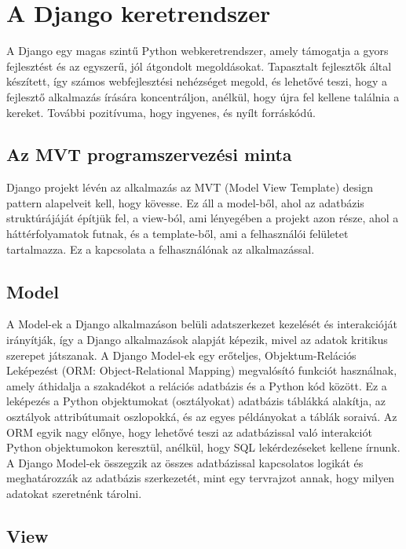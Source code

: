 \chapter{A Django keretrendszer}
\label{chap:intro}

A Django egy magas szintű Python webkeretrendszer, amely támogatja a gyors fejlesztést és az egyszerű, jól átgondolt megoldásokat. Tapasztalt fejlesztők által készített, így számos webfejlesztési nehézséget megold, és lehetővé teszi, hogy a fejlesztő alkalmazás írására koncentráljon, anélkül, hogy újra fel kellene találnia a kereket. További pozitívuma, hogy ingyenes, és nyílt forráskódú.\cite{Djangoproject}

\section{Az MVT programszervezési minta}

Django projekt lévén az alkalmazás az MVT (Model View Template) design pattern alapelveit kell, hogy kövesse. Ez áll a model-ből, ahol az adatbázis struktúrájáját építjük fel, a view-ból, ami lényegében a projekt azon része, ahol a háttérfolyamatok futnak, és a template-ből, ami a felhasználói felületet tartalmazza. Ez a kapcsolata a felhasználónak az alkalmazással.

\section{Model}

A Model-ek a Django alkalmazáson belüli adatszerkezet kezelését és interakcióját irányítják, így a Django alkalmazások alapját képezik, mivel az adatok kritikus szerepet játszanak.
A Django Model-ek egy erőteljes, Objektum-Relációs Leképezést (ORM: Object-Relational Mapping) megvalósító funkciót használnak, amely áthidalja a szakadékot a relációs adatbázis és a Python kód között. Ez a leképezés a Python objektumokat (osztályokat) adatbázis táblákká alakítja, az osztályok attribútumait oszlopokká, és az egyes példányokat a táblák soraivá.
Az ORM egyik nagy előnye, hogy lehetővé teszi az adatbázissal való interakciót Python objektumokon keresztül, anélkül, hogy SQL lekérdezéseket kellene írnunk.
A Django Model-ek összegzik az összes adatbázissal kapcsolatos logikát és meghatározzák az adatbázis szerkezetét, mint egy tervrajzot annak, hogy milyen adatokat szeretnénk tárolni.\cite{MVT_Design}

\section{View}

